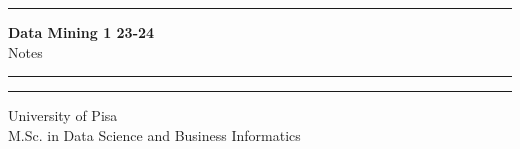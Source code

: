 \documentclass[12pt]{report}
\begin{document}
\begin{titlepage}
\hrule
\vspace{15pt}
\begin{center}
    \Huge{\textbf{\Huge \textbf{Data Mining 1 23-24}} \\ Notes}\\
\end{center}
\vspace{15pt}
\hrule
\vfill
\hrule
\begin{center}
    \Large University of Pisa \\ M.Sc. in Data Science and Business Informatics
\end{center}
\end{titlepage}

\tableofcontents








\nocite{*}

\clearpage
\end{document}
